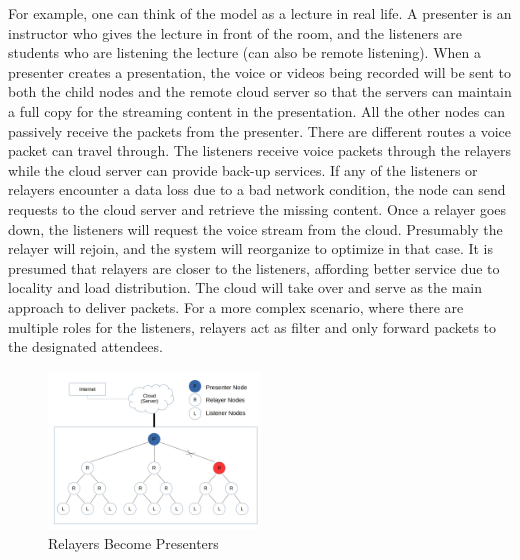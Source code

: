 For example, one can think of the model as a lecture in real life. A presenter
is an instructor who gives the lecture in front of the room, and the
listeners are
students who are listening the lecture (can also be remote listening). When
a
presenter creates a presentation, the voice or videos being recorded will be
sent to both the child nodes and the remote cloud server so that the servers can
maintain a full copy for the streaming content in the presentation. All the
other nodes can passively receive the packets from the presenter.
There are different routes a voice packet can travel through. The
listeners receive voice packets through the relayers while the cloud server
can provide back-up services. If any of the listeners or relayers encounter a
data loss due to a bad network condition, the node can send requests to the
cloud server and retrieve the missing content. Once a relayer goes down,
the listeners will request the voice stream from the cloud. Presumably the
relayer will rejoin, and the system will reorganize to optimize in that case.
It is presumed that relayers are closer to the listeners, affording better
service due to locality and load distribution. The cloud will take
over
and serve as the main approach to deliver packets.
For a more complex scenario, where there are multiple roles for the listeners,
relayers act as filter and only forward packets to the designated attendees.

\begin{figure}[h!]
  \centering
      \includegraphics[width=0.5\textwidth]{figures/model2_test2.jpg}
  \caption{Relayers Become Presenters}
  \label{fig:mod2}
\end{figure}

